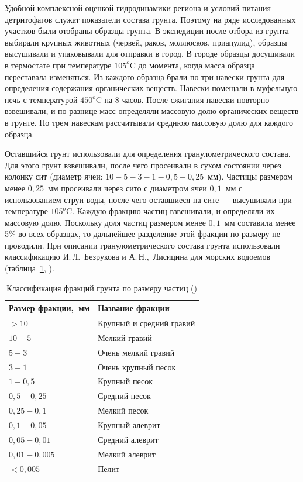Удобной комплексной оценкой гидродинамики региона и условий питания детритофагов служат показатели состава грунта. 
Поэтому на ряде исследованных участков были отобраны образцы грунта. 
В экспедиции после отбора из грунта выбирали крупных животных (червей, раков, моллюсков, приапулид), образцы высушивали и упаковывали для отправки в город. 
В городе образцы досушивали в термостате при температуре $105^o$C до момента, когда масса образца переставала изменяться. 
Из каждого образца брали по три навески грунта для определения содержания органических веществ. 
Навески помещали в муфельную печь с температурой $450^o$C на $8$ часов. 
После сжигания навески повторно взвешивали, и по разнице масс определяли массовую долю органических веществ в грунте. 
По трем навескам рассчитывали среднюю массовую долю для каждого образца.

Оставшийся грунт использовали для определения гранулометрического состава. 
Для этого грунт взвешивали, после чего просеивали в сухом состоянии через колонку сит (диаметр ячеи: $10 - 5 - 3 - 1 - 0,5 - 0,25$~мм). 
Частицы размером менее $0,25$~мм просеивали через сито с диаметром ячеи $0,1$~мм с использованием струи воды, после чего оставшиеся на сите --- высушивали при температуре $105^o$C. 
Каждую фракцию частиц взвешивали, и определяли их массовую долю. 
Поскольку доля частиц размером менее $0,1$~мм составила менее 5\% во всех образцах, то дальнейшее разделение этой фракции по размеру не проводили. 
При описании гранулометрического состава грунта использовали классификацию И.\,Л.~Безрукова и А.\,Н.,~Лисицина для морских водоемов (таблица~\ref{tab:lisicyn_granulometriya}, \cite{Bezrukov_Lisicyn_1960}).
\begin{table}[h]
    \centering
    \caption{Классификация фракций грунта по размеру частиц (\cite{Bezrukov_Lisicyn_1960})}
    \label{tab:lisicyn_granulometriya}
\begin{tabular}{|l|l|}
    \hline
    Размер фракции,~мм & Название фракции         \\ \hline
     $> 10$    & Крупный и средний гравий  \\
    $10-5$               & Мелкий гравий         \\
    $5-3$                & Очень мелкий гравий   \\
    $3-1$                & Очень крупный песок   \\
    $1-0,5$              & Крупный песок         \\
    $0,5-0,25$           & Средний песок         \\
    $0,25-0,1$           & Мелкий песок          \\
    $0,1-0,05$           & Крупный алеврит       \\
    $0,05-0,01$          & Средний алеврит       \\
    $0,01-0,005$         & Мелкий алеврит        \\
    $< 0,005$     & Пелит                   \\ \hline
\end{tabular}
\end{table}


